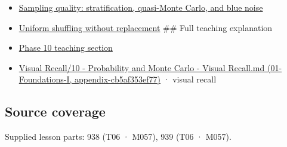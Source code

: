 \begin{itemize}
\item
  \hyperref[appendix-9f693ffd82bc]{Sampling quality: stratification, quasi-Monte Carlo, and blue noise}
\item
  \hyperref[appendix-184fcc411663]{Uniform shuffling without replacement} \#\# Full teaching explanation
\item
  \hyperref[02-foundations-ii-ch029-a-computer-produces-deterministic-pseudorandom-sequences]{Phase 10 teaching section}
\item
  \href{../01-Foundations-I/main.pdf\#nameddest=appendix-cb5af353ef77}{Visual Recall/10 - Probability and Monte Carlo - Visual Recall.md (01-Foundations-I, appendix-cb5af353ef77)} · visual recall
\end{itemize}

\subsection{Source coverage}\label{appendix-daaf25bfd3a0-source-coverage}

Supplied lesson parts: 938 (T06 · M057), 939 (T06 · M057).
